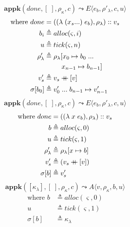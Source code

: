 \documentclass[12pt,draft]{article}
\newcommand\mdoubleplus{\ensuremath{\mathbin{+\mkern-9mu+}}}
\newcommand{\lamsyn}[2]{(\lambda\;(#1 ...)\;#2)}
\newcommand{\vararglamsyn}[2]{(\lambda\;#1\;#2)}
\begin{document}
\begin{multicols*}{2}
\vfill\null
\columnbreak


\[
\textbf{appk}(done, [\;], \rho_{\kappa}, c)
\leadsto
E\langle
e_b , \rho'_{\lambda} , c , u
\rangle
\]
\vspace{-11mm}
\begin{align*}
\text{where } done &= (\lamsyn{x_s}{e_b}, \rho_{\lambda}) :: v_s \\
b_i &\triangleq alloc(\varsigma, i) \\
u &\triangleq tick(\varsigma, n) \\
\rho'_{\lambda} &\triangleq \rho_{\lambda}[x_0 \mapsto b_0 \;... \\
&\;\;\;\;\;\;\;\;\;x_{n-1} \mapsto b_{n-1}] \\
v'_s &\triangleq v_s \mdoubleplus [v] \\
\sigma[b_0] &\triangleq v'_0 \;...\; b_{n-1} \mapsto v'_{n-1}
\end{align*}
\[
\textbf{appk}(done, [\;], \rho_{\kappa}, c)
\leadsto
E\langle
e_b , \rho'_{\lambda} , c , u
\rangle
\]
\vspace{-9mm}
\begin{align*}
\text{where } done &= (\vararglamsyn{x}{e_b}, \rho_{\lambda}) :: v_s \\
b &\triangleq alloc(\varsigma, 0) \\
u &\triangleq tick(\varsigma, 1) \\
\rho'_{\lambda} &\triangleq \rho_{\lambda}[x \mapsto b] \\
v'_s &\triangleq (v_s \mdoubleplus [v]) \\
\sigma[b] &\triangleq v'_s
\end{align*}
\[
\textbf{appk}([\kappa_{\lambda}], [\;], \rho_{\kappa}, c)
\leadsto
A\langle
v , \rho_{\kappa} , b , u
\rangle
\]
\vspace{-10mm}
\begin{align*}
\text{where } b &\triangleq alloc(\varsigma, 0) \\
u &\triangleq tick(\varsigma, 1) \\
\sigma[b] &\triangleq \kappa_{\lambda}
\end{align*}

\end{multicols*}
\end{document}
